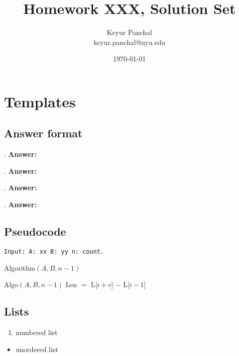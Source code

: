\documentclass[11pt]{article}
\begin{document}

\title{Homework XXX, Solution Set}
\author{Keyur Panchal\\keyur.panchal@nyu.edu}
\date{\today}

\maketitle

\tableofcontents
\section{Templates}

\subsection{Answer format}
\bigskip {}. \textbf{Answer:}

\bigskip {}. \textbf{Answer:}

\bigskip {}. \textbf{Answer:}

\bigskip {}. \textbf{Answer:}

\pagebreak

\subsection{Pseudocode}
\begin{algorithm}
	\texttt{Input: A: xx B: yy n: count. }
	\begin{algorithmic}
    	\caption{Algorithm$(A, B, n-1)$}
    	    \STATE
	    \ELSE 
	    \STATE Algo$(A, B, n-1)$
	    \ENDIF
                        \STATE Len $=$ L[$i+r$] $-$ L[$i-1$]
                    \ENDFOR
            \ENDFOR
	\end{algorithmic}
\end{algorithm}

\subsection{Lists}

\begin{enumerate}
    \item {numbered list}
\end{enumerate}

\begin{itemize}
    \item {unordered list}
\end{itemize}
\end{document}
